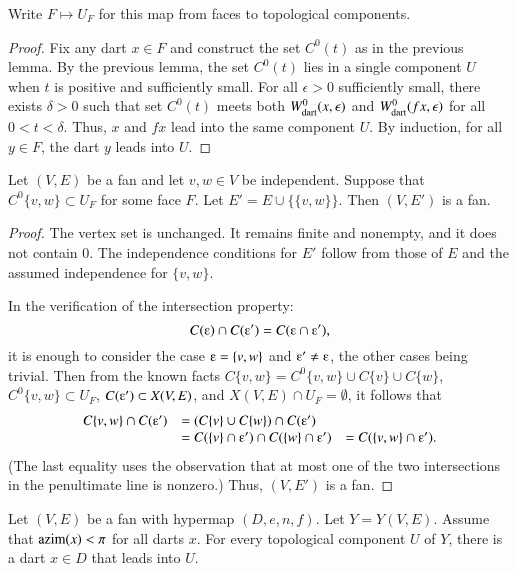Write $F\mapsto U_F$ for this map from faces to topological components.

\begin{proof}  Fix any dart $x\in F$ and construct the set $C^0(t)$ as
in the previous lemma.  By the previous lemma, the set $C^0(t)$ lies in a single
component $U$ when $t$ is positive and sufficiently small.  For all $\epsilon>0$
sufficiently small, there exists $\delta>0$ such that set $C^0(t)$ meets
both $W^0_{\text{dart}}(x,\epsilon)$ and $W^0_{\text{dart}}(f x,\epsilon)$ for all $0<t<\delta$.  Thus,
$x$ and $f x$ lead into the same component $U$.  By induction, for all
$y\in F$, the dart $y$ leads into $U$.
\end{proof}

\begin{lemma}\label{lemma:add-edge}
Let $(V,E)$ be a fan and let $v,w\in V$ be independent.   Suppose that
$C^0\{v,w\}\subset U_F$ for some face $F$.  Let $E' = E\cup\{\{v,w\}\}$.  Then
$(V,E')$ is a fan.
\end{lemma}

\begin{proof} The vertex set is unchanged.  It remains finite and nonempty, and it does not contain $0$.  The independence conditions for $E'$ follow from those of $E$
and the assumed independence for $\{v,w\}$.  

In the verification of the intersection property:
$$
C(\e)\cap C(\e') = C(\e \cap \e'),
$$
it is enough to consider the case $\e = \{v,w\}$ and $\e' \ne \e$, the other cases being trivial.  Then from the known facts $C\{v,w\} = C^0\{v,w\}\cup C\{v\}\cup C\{w\}$, $C^0\{v,w\}\subset U_F$,   $C(\e')\subset X(V,E)$, and $X(V,E)\cap U_F=\emptyset$, it follows that
$$
\begin{array}{rll}
C\{v,w\} \cap C(\e')  &= (C\{v\} \cup C\{w\}) \cap C(\e') \\
  &= C(\{v\}\cap \e') \cap C(\{w\}\cap \e')
  &= C(\{v,w\}\cap \e').
\end{array}
$$
(The last equality uses the observation that at most one of the two intersections in the penultimate line is nonzero.)
Thus, $(V,E')$ is a fan.
\end{proof}


\begin{lemma}
Let $(V,E)$ be a fan with hypermap $(D,e,n,f)$. Let $Y=Y(V,E)$. Assume that ${\operatorname{azim}}(x)<\pi$ for all darts $x$.  For every topological component $U$ of $Y$, there is a dart $x\in D$ that leads into $U$.
\end{lemma}

